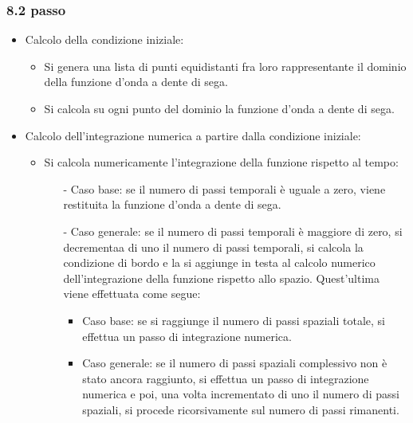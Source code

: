 \subsubsection*{8.2 passo}
\begin{itemize}
\item Calcolo della condizione iniziale:
\begin{itemize}
\item Si genera una lista di punti equidistanti fra loro rappresentante il dominio della funzione d'onda a dente di sega.
\item Si calcola su ogni punto del dominio la funzione d'onda a dente di sega. 
\end{itemize}
\item Calcolo dell'integrazione numerica a partire dalla condizione iniziale:
\begin{itemize}
\item Si calcola numericamente l'integrazione della funzione rispetto al tempo:
\begin{itemize}
\item[-] Caso base: se il numero di passi temporali è uguale a zero, viene restituita la funzione d'onda a dente di sega.
\item[-] Caso generale: se il numero di passi temporali è maggiore di zero, si decrementaa di uno il numero di passi temporali, si calcola la condizione di bordo e la si aggiunge in testa al calcolo numerico dell'integrazione della funzione rispetto allo spazio. Quest'ultima viene effettuata come segue:
\begin{itemize}
\item Caso base: se si raggiunge il numero di passi spaziali totale, si effettua un passo di integrazione numerica.
\item Caso generale: se il numero di passi spaziali complessivo non è stato ancora raggiunto, si effettua un passo di integrazione numerica e poi, una volta incrementato di uno il numero di passi spaziali, si procede ricorsivamente sul numero di passi rimanenti. 
\end{itemize}
\end{itemize}
\end{itemize}
\end{itemize}






